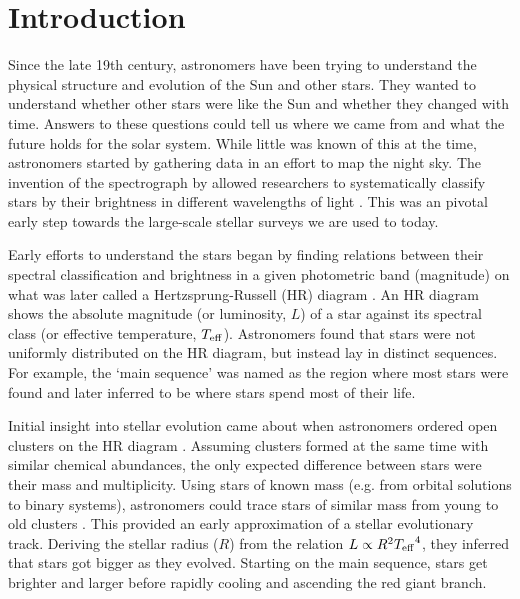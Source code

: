 %
%
%
%
%
\chapter{Introduction}

Since the late 19th century, astronomers have been trying to understand the physical structure and evolution of the Sun and other stars. They wanted to understand whether other stars were like the Sun and whether they changed with time. Answers to these questions could tell us where we came from and what the future holds for the solar system. While little was known of this at the time, astronomers started by gathering data in an effort to map the night sky. The invention of the spectrograph by \citet{Draper1874} allowed researchers to systematically classify stars by their brightness in different wavelengths of light \citep{Maury.Pickering1897}. This was an pivotal early step towards the large-scale stellar surveys we are used to today.


Early efforts to understand the stars began by finding relations between their spectral classification and brightness in a given photometric band (magnitude) on what was later called a Hertzsprung-Russell (HR) diagram \citep[e.g.][]{Russell1914}. An HR diagram shows the absolute magnitude (or luminosity, \(L\)) of a star against its spectral class (or effective temperature, \({T_\mathrm{eff}}\)). Astronomers found that stars were not uniformly distributed on the HR diagram, but instead lay in distinct sequences. For example, the `main sequence' was named as the region where most stars were found and later inferred to be where stars spend most of their life.

Initial insight into stellar evolution came about when astronomers ordered open clusters on the HR diagram \needcite. Assuming clusters formed at the same time with similar chemical abundances, the only expected difference between stars were their mass and multiplicity. Using stars of known mass (e.g. from orbital solutions to binary systems), astronomers could trace stars of similar mass from young to old clusters \needcite. This provided an early approximation of a stellar evolutionary track. Deriving the stellar radius (\(R\)) from the relation \(L \propto R^2 {T_\mathrm{eff}}^4\), they inferred that stars got bigger as they evolved. Starting on the main sequence, stars get brighter and larger before rapidly cooling and ascending the red giant branch.

